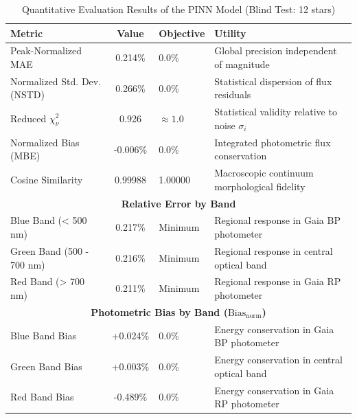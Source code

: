 
\begin{table}[htpb]
\centering
\caption{Quantitative Evaluation Results of the PINN Model (Blind Test: 12 stars)}
\label{tab:pinn_evaluation}
\begin{tabular}{lcll}
\hline
\textbf{Metric} & \textbf{Value} & \textbf{Objective} & \textbf{Utility} \\
\hline
Peak-Normalized MAE & 0.214\% & 0.0\% & Global precision independent of magnitude \\
Normalized Std. Dev. (NSTD) & 0.266\% & 0.0\% & Statistical dispersion of flux residuals \\
Reduced $\chi^2_\nu$ & 0.926 & $\approx 1.0$ & Statistical validity relative to noise $\sigma_i$ \\
Normalized Bias (MBE) & -0.006\% & 0.0\% & Integrated photometric flux conservation \\
Cosine Similarity & 0.99988 & 1.00000 & Macroscopic continuum morphological fidelity \\
\hline
\multicolumn{4}{c}{\textbf{Relative Error by Band}} \\
\hline
Blue Band (< 500 nm) & 0.217\% & Minimum & Regional response in Gaia BP photometer \\
Green Band (500 - 700 nm) & 0.216\% & Minimum & Regional response in central optical band \\
Red Band (> 700 nm) & 0.211\% & Minimum & Regional response in Gaia RP photometer \\
\hline
\multicolumn{4}{c}{\textbf{Photometric Bias by Band ($\text{Bias}_{\text{norm}}$)}} \\
\hline
Blue Band Bias & +0.024\% & 0.0\% & Energy conservation in Gaia BP photometer \\
Green Band Bias & +0.003\% & 0.0\% & Energy conservation in central optical band \\
Red Band Bias & -0.489\% & 0.0\% & Energy conservation in Gaia RP photometer \\
\hline
\end{tabular}
\end{table}
